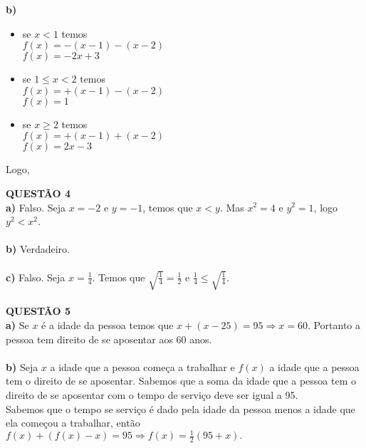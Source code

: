 \documentclass[12pt]{article}
\begin{document}
{\bf b) } 
\begin{itemize}
\item se $x<1$ temos\\
$f(x)=-(x-1)-(x-2)$\\
$f(x)=-2x+3$\\
\item se $1\leq x<2$ temos\\
$f(x)=+(x-1)-(x-2)$\\
$f(x)=1$
\item se $x\geq2$ temos\\
$f(x)=+(x-1)+(x-2)$\\
$f(x)=2x-3$\\
\end{itemize}
Logo,\\

\begin{comment}
$
f(x) = \left\{
\begin{array}{rcl}
-2x+31,& \mbox{se} & x<1\\
1, & \mbox{se} & 1\leqx<2\\
2x-3, & \mbox{se} & x\geq 2
\end{array}
\right.
$\\
\end{comment}


{\bf QUESTÃO 4}\\

{\bf a) } Falso. Seja $x=-2$ e $y=-1$, temos que $x<y$. Mas $x^2=4$ e $y^2=1$, logo $y^2<x^2$.\\
\\
{\bf b) } Verdadeiro.\\
\\
{\bf c) } Falso. Seja $x=\frac{1}{4}$. Temos que $\sqrt{\frac{1}{4}}=\frac{1}{2}$ e $\frac{1}{4}\leq\sqrt{\frac{1}{4}}$.
\\
\\

{\bf QUESTÃO 5}\\

{\bf a) } Se $x$ é a idade da pessoa temos que $x+(x-25)=95\Rightarrow x=60$. Portanto a pessoa tem direito de se aposentar aos $60$ anos.\\
\\
{\bf b) } Seja $x$ a idade que a pessoa começa a trabalhar e $f(x)$ a idade que a pessoa tem o direito de se aposentar. Sabemos que a soma da idade que a pessoa tem o direito de se aposentar com o tempo de serviço deve ser igual a 95.\\
Sabemos que o tempo se serviço é dado pela idade da pessoa menos a idade que ela começou a trabalhar, então $f(x)+(f(x)-x)=95\Rightarrow f(x)=\frac{1}{2}(95+x).$
\end{document}
